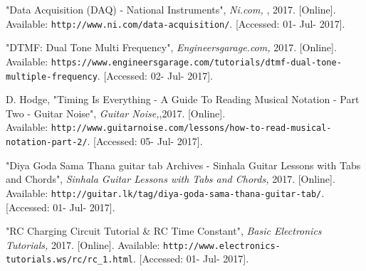 \renewcommand{\refname}{}
\begin{thebibliography}{}
\vspace*{-1cm}
%

"Data Acquisition (DAQ) - National Instruments", 
\textit{Ni.com, }, 2017. [Online].\\
Available: \texttt{http://www.ni.com/data-acquisition/}. [Accessed: 01- Jul- 2017].

"DTMF: Dual Tone Multi Frequency",
\textit {Engineersgarage.com,} 2017. [Online].\\ 
Available: \texttt{https://www.engineersgarage.com/tutorials/dtmf-dual-tone-multiple-frequency}. [Accessed: 02- Jul- 2017].

D. Hodge, "Timing Is Everything - A Guide To Reading Musical Notation - Part Two - Guitar Noise",
\textit{Guitar Noise,},2017. [Online].\\
Available: \texttt{http://www.guitarnoise.com/lessons/how-to-read-musical-notation-part-2/}.  [Accessed: 05- Jul- 2017].

"Diya Goda Sama Thana guitar tab Archives - Sinhala Guitar Lessons with Tabs and Chords",
\textit{Sinhala Guitar Lessons with Tabs and Chords,} 2017. [Online]. Available: \texttt{http://guitar.lk/tag/diya-goda-sama-thana-guitar-tab/}. [Accessed: 01- Jul- 2017].

"RC Charging Circuit Tutorial \& RC Time Constant",
\textit{ Basic Electronics Tutorials,}  2017. [Online]. Available: \texttt{http://www.electronics-tutorials.ws/rc/rc\_1.html}. [Accessed: 01- Jul- 2017].

\end{thebibliography}
